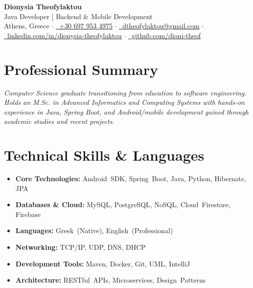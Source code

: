 \documentclass[a4paper,11pt]{article}
\begin{document}
\begin{center}
    {\Huge\bfseries\color{primary} Dionysia Theofylaktou}\\[0.15em]
    {\large\color{secondary} Java Developer | Backend \& Mobile Development}\\[0.25em]
    \textcolor{secondary}{
        Athens, Greece $\cdot$
        \href{tel:+306979534975}{\faPhone~+30 697 953 4975} $\cdot$
        \href{mailto:dtheofylaktou@gmail.com}{\faEnvelope~dtheofylaktou@gmail.com} $\cdot$
        \href{https://www.linkedin.com/in/dionysia-theofylaktou/}{\faLinkedin~linkedin.com/in/dionysia-theofylaktou} $\cdot$
        \href{https://github.com/dioni-theof}{\faGithub~github.com/dioni-theof}
    }
\end{center}

\vspace{0.15em}

\section*{Professional Summary}
\textit{Computer Science graduate transitioning from education to software engineering. Holds an M.Sc. in Advanced Informatics and Computing Systems with hands-on experience in Java, Spring Boot, and Android/mobile development gained through academic studies and recent projects.}

\vspace{0.2em}

\section*{Technical Skills \& Languages}
\noindent
\begin{minipage}[t]{0.49\textwidth}
\begin{itemize}[leftmargin=*, noitemsep, topsep=0pt, parsep=1pt, partopsep=0pt]
    \item \textbf{Core Technologies:} Android~SDK, Spring~Boot, Java, Python, Hibernate, JPA
    \item \textbf{{Databases \& Cloud:}} MySQL, PostgreSQL, NoSQL, Cloud~Firestore, Firebase
    \item \textbf{{Languages:}} Greek~(Native), English~(Professional)
\end{itemize}
\end{minipage}\hfill
\begin{minipage}[t]{0.49\textwidth}
\begin{itemize}[leftmargin=*, noitemsep, topsep=0pt, parsep=1pt, partopsep=0pt]
    \item \textbf{{Networking:}} TCP/IP, UDP, DNS, DHCP
    \item \textbf{{Development Tools:}} Maven, Docker, Git, UML, IntelliJ
    \item \textbf{{Architecture:}} RESTful~APIs, Microservices, Design~Patterns
\end{itemize}
\end{minipage}
\end{document}
